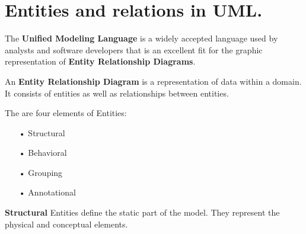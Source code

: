 \section{Entities and relations in UML.}
\begin{flushleft}
\setlength{\parindent}{2ex}
\par
The \textbf{Unified Modeling Language} is a widely accepted language used by analysts and software developers that is an excellent fit for the graphic representation of \textbf{Entity Relationship Diagrams}.
\par 
An \textbf{Entity Relationship Diagram} is a representation of data within a domain. It consists of entities as well as relationships between entities.
\par 
The are four elements of Entities:
\begin{enumerate}
		\item[•]Structural
    	\item[•]Behavioral 
    	\item[•]Grouping
    	\item[•]Annotational
\end{enumerate}
\end{flushleft}
\textbf{Structural} Entities define the static part of the model. They represent the physical and conceptual elements.
